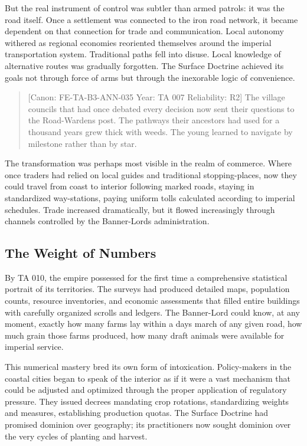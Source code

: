 But the real instrument of control was subtler than armed patrols: it
was the road itself. Once a settlement was connected to the iron road
network, it became dependent on that connection for trade and
communication. Local autonomy withered as regional economies reoriented
themselves around the imperial transportation system. Traditional paths
fell into disuse. Local knowledge of alternative routes was gradually
forgotten. The Surface Doctrine achieved its goals not through force of
arms but through the inexorable logic of convenience.

\begin{quote}
{[}Canon: FE-TA-B3-ANN-035 \textbar{} Year: TA 007 \textbar{}
Reliability: R2{]} The village councils that had once debated every
decision now sent their questions to the Road-Warden\textquotesingle s
post. The pathways their ancestors had used for a thousand years grew
thick with weeds. The young learned to navigate by milestone rather than
by star.
\end{quote}

The transformation was perhaps most visible in the realm of commerce.
Where once traders had relied on local guides and traditional
stopping-places, now they could travel from coast to interior following
marked roads, staying in standardized way-stations, paying uniform tolls
calculated according to imperial schedules. Trade increased
dramatically, but it flowed increasingly through channels controlled by
the Banner-Lord\textquotesingle s administration.

\subsection{The Weight of Numbers}\label{the-weight-of-numbers}

By TA 010, the empire possessed for the first time a comprehensive
statistical portrait of its territories. The surveys had produced
detailed maps, population counts, resource inventories, and economic
assessments that filled entire buildings with carefully organized
scrolls and ledgers. The Banner-Lord could know, at any moment, exactly
how many farms lay within a day\textquotesingle s march of any given
road, how much grain those farms produced, how many draft animals were
available for imperial service.

This numerical mastery bred its own form of intoxication. Policy-makers
in the coastal cities began to speak of the interior as if it were a
vast mechanism that could be adjusted and optimized through the proper
application of regulatory pressure. They issued decrees mandating crop
rotations, standardizing weights and measures, establishing production
quotas. The Surface Doctrine had promised dominion over geography; its
practitioners now sought dominion over the very cycles of planting and
harvest.

